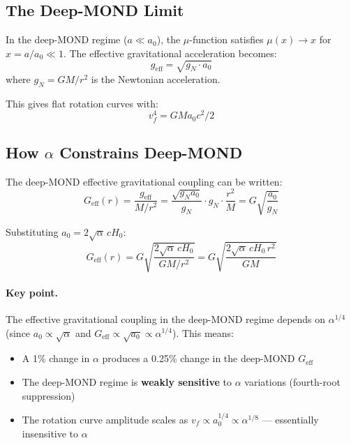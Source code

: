 \documentclass[12pt,a4paper]{article}
\newcommand{\Hzero}{H_0}
\begin{document}
\subsection{The Deep-MOND Limit}

In the deep-MOND regime ($a \ll a_0$), the $\mu$-function satisfies
$\mu(x) \to x$ for $x = a/a_0 \ll 1$. The effective gravitational
acceleration becomes:
\begin{equation}
g_{\mathrm{eff}} = \sqrt{g_N \cdot a_0}
\end{equation}
where $g_N = GM/r^2$ is the Newtonian acceleration.

This gives flat rotation curves with:
\begin{equation}
v_f^4 = G M a_0 c^2 / 2
\end{equation}

\subsection{How $\alpha$ Constrains Deep-MOND}

The deep-MOND effective gravitational coupling can be written:
\begin{equation}
G_{\mathrm{eff}}(r)
= \frac{g_{\mathrm{eff}}}{M/r^2}
= \frac{\sqrt{g_N a_0}}{g_N} \cdot g_N \cdot \frac{r^2}{M}
= G\sqrt{\frac{a_0}{g_N}}
\end{equation}

Substituting $a_0 = 2\sqrt{\alpha}\,c\Hzero$:
\begin{equation}
G_{\mathrm{eff}}(r) = G\sqrt{\frac{2\sqrt{\alpha}\,c\Hzero}{GM/r^2}}
= G\sqrt{\frac{2\sqrt{\alpha}\,c\Hzero\,r^2}{GM}}
\end{equation}

\paragraph{Key point.}
The effective gravitational coupling in the deep-MOND regime depends on
$\alpha^{1/4}$ (since $a_0 \propto \sqrt{\alpha}$ and $G_{\mathrm{eff}}
\propto \sqrt{a_0} \propto \alpha^{1/4}$). This means:
\begin{itemize}
\item A 1\% change in $\alpha$ produces a 0.25\% change in the deep-MOND
  $G_{\mathrm{eff}}$
\item The deep-MOND regime is \textbf{weakly sensitive} to $\alpha$
  variations (fourth-root suppression)
\item The rotation curve amplitude scales as $v_f \propto a_0^{1/4}
  \propto \alpha^{1/8}$ --- essentially insensitive to $\alpha$
\end{itemize}
\end{document}
